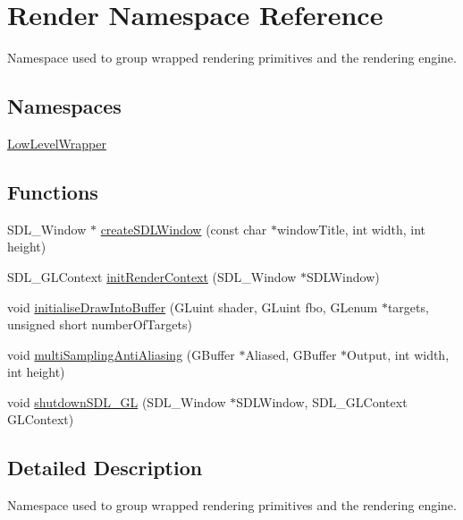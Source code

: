 \hypertarget{namespace_render}{}\section{Render Namespace Reference}
\label{namespace_render}


Namespace used to group wrapped rendering primitives and the rendering engine.  


\subsection*{Namespaces}
\begin{DoxyCompactItemize}
\item 
 \hyperlink{namespace_render_1_1_low_level_wrapper}{Low\+Level\+Wrapper}
\end{DoxyCompactItemize}
\subsection*{Functions}
\begin{DoxyCompactItemize}
\item 
S\+D\+L\+\_\+\+Window $\ast$ \hyperlink{namespace_render_adf29e56ff326677c124861739820b16a}{create\+S\+D\+L\+Window} (const char $\ast$window\+Title, int width, int height)
\item 
S\+D\+L\+\_\+\+G\+L\+Context \hyperlink{namespace_render_aad76a251628691722b0712c95bf0bb02}{init\+Render\+Context} (S\+D\+L\+\_\+\+Window $\ast$S\+D\+L\+Window)
\item 
void \hyperlink{namespace_render_a886d42ffb43f1ebedbf9bf74a629d674}{initialise\+Draw\+Into\+Buffer} (G\+Luint shader, G\+Luint fbo, G\+Lenum $\ast$targets, unsigned short number\+Of\+Targets)
\item 
void \hyperlink{namespace_render_abb1b94ec984a8838a7fe3904dacb5c75}{multi\+Sampling\+Anti\+Aliasing} (G\+Buffer $\ast$Aliased, G\+Buffer $\ast$Output, int width, int height)
\item 
void \hyperlink{namespace_render_aab49d380cf878a16923cb047da7a273d}{shutdown\+S\+D\+L\+\_\+\+GL} (S\+D\+L\+\_\+\+Window $\ast$S\+D\+L\+Window, S\+D\+L\+\_\+\+G\+L\+Context G\+L\+Context)
\end{DoxyCompactItemize}


\subsection{Detailed Description}
Namespace used to group wrapped rendering primitives and the rendering engine. 

